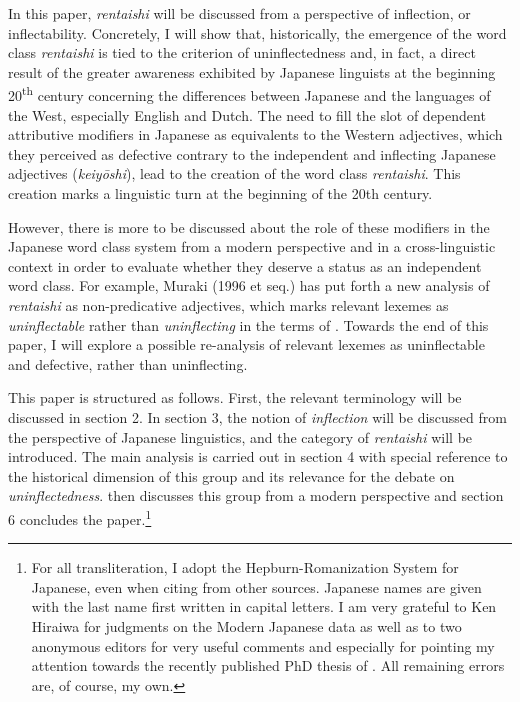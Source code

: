 \documentclass[output=paper]{langscibook}
\begin{document}
In this paper, \textit{rentaishi} will be discussed from a perspective of inflection, or inflectability. Concretely, I will show that, historically, the emergence of the word class \textit{rentaishi} is tied to the criterion of uninflectedness and, in fact, a direct result of the greater awareness exhibited by Japanese linguists at the beginning 20\textsuperscript{th} century concerning the differences between Japanese and the languages of the West, especially English and Dutch. The need to fill the slot of dependent attributive modifiers in Japanese as equivalents to the Western adjectives, which they perceived as defective contrary to the independent and inflecting Japanese adjectives (\textit{keiyōshi}), lead to the creation of the word class \textit{rentaishi}. This creation marks a linguistic turn at the beginning of the 20th century.

However, there is more to be discussed about the role of these modifiers in the Japanese word class system from a modern perspective and in a cross-linguistic context in order to evaluate whether they deserve a status as an independent word class. For example, Muraki (1996 et seq.) has put forth a new analysis of \textit{rentaishi} as non-predicative adjectives, which marks relevant lexemes as \textit{uninflectable} rather than \textit{uninflecting} in the terms of \citet{Spencer2020}. Towards the end of this paper, I will explore a possible re-analysis of relevant lexemes as uninflectable and defective, rather than uninflecting.

This paper is structured as follows. First, the relevant terminology will be discussed in section 2. In section 3, the notion of \textit{inflection} will be discussed from the perspective of Japanese linguistics, and the category of \textit{rentaishi} will be introduced. The main analysis is carried out in section 4 with special reference to the historical dimension of this group and its relevance for the debate on \textit{uninflectedness}.  then discusses this group from a modern perspective and section 6 concludes the paper.\footnote{For all transliteration, I adopt the Hepburn-Romanization System for Japanese, even when citing from other sources. Japanese names are given with the last name first written in capital letters. I am very grateful to Ken Hiraiwa for judgments on the Modern Japanese data as well as to two anonymous editors for very useful comments and especially for pointing my attention towards the recently published PhD thesis of \citet{Nespoli2023}. All remaining errors are, of course, my own.}
\end{document}
